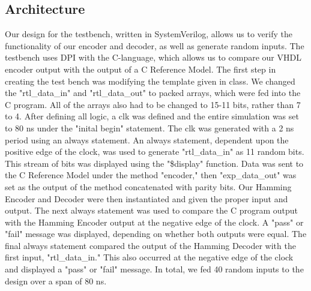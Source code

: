 \documentclass[paper=letter, fontsize=11pt]{scrartcl}
\numberwithin{equation}{section} %
\numberwithin{figure}{section} %
\numberwithin{table}{section} %
\begin{document}
\subsection{Architecture}
\begin{flushleft}
	Our design for the testbench, written in SystemVerilog, allows us to verify the functionality of our encoder and decoder, as well as generate random inputs. The testbench uses DPI with the C-language, which allows us to compare our VHDL encoder output with the output of a C Reference Model. The first step in creating the test bench was modifying the template given in class. We changed the "rtl\_data\_in" and "rtl\_data\_out" to packed arrays, which were fed into the C program. All of the arrays also had to be changed to 15-11 bits, rather than 7 to 4. After defining all logic, a clk was defined and the entire simulation was set to 80 ns under the "inital begin" statement. The clk was generated with a 2 ns period using an always statement. An always statement, dependent upon the positive  edge of the clock, was used to generate "rtl\_data\_in" as 11 random bits. This stream of bits was displayed using the "\$display" function. Data was sent to the C Reference Model under the method "encoder," then "exp\_data\_out" was set as the output of the method concatenated with parity bits. Our Hamming Encoder and Decoder were then instantiated and given the proper input and output. The next always statement was used to compare the C program output with the Hamming Encoder output at the negative edge of the clock. A "pass" or "fail" message was displayed, depending on whether both outputs were equal. The final always statement compared the output of the Hamming Decoder with the first input, "rtl\_data\_in." This also occurred at the negative edge of the clock and displayed a "pass" or "fail" message. In total, we fed 40 random inputs to the design over a span of 80 ns.     
	         
\end{flushleft}
\end{document}
